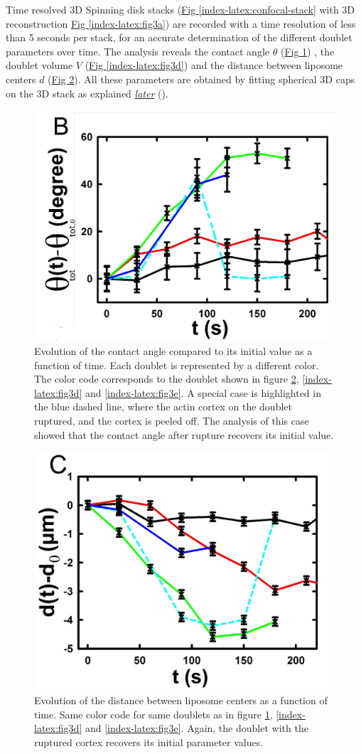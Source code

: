\documentclass[A4paperpaper,11pt,english]{sphinxmanual}
\begin{document}
Time resolved 3D Spinning disk stacks (\hyperref[index-latex:confocal-stack]{Fig  \ref*{index-latex:confocal-stack}} with 3D reconstruction
\hyperref[index-latex:fig3a]{Fig  \ref*{index-latex:fig3a}}) are recorded with a time resolution of less than 5 seconds per stack, for an accurate determination of the different
doublet parameters over time. The analysis reveals the contact angle \(\theta\) (\hyperref[index-latex:fig3b]{Fig  \ref*{index-latex:fig3b}}) , the
doublet volume \(V\) (\hyperref[index-latex:fig3d]{Fig  \ref*{index-latex:fig3d}}) and the distance between liposome
centers \(d\) (\hyperref[index-latex:fig3c]{Fig  \ref*{index-latex:fig3c}}). All these parameters are obtained by
fitting spherical 3D caps on the 3D stack as explained {\hyperref[index-latex:full3dfit]{\emph{later}}} ().
\begin{figure}[htbp]
\centering
\capstart

\includegraphics[width=0.500\linewidth]{Fig_03-B.png}
\caption{Evolution of the contact angle compared to its initial value as a function of
time.  Each doublet is represented by a different color. The color code corresponds to the doublet
shown in figure \hyperref[index-latex:fig3c]{ \ref*{index-latex:fig3c}}, \hyperref[index-latex:fig3d]{ \ref*{index-latex:fig3d}}
and \hyperref[index-latex:fig3e]{ \ref*{index-latex:fig3e}}. A special case is highlighted in the blue dashed line,
where the actin cortex on the doublet ruptured, and the cortex is peeled off.
The analysis of this case showed that the contact angle after rupture recovers its initial value.}\label{index-latex:fig3b}\end{figure}
\begin{figure}[htbp]
\centering
\capstart

\includegraphics[width=0.500\linewidth]{Fig_03-C.png}
\caption{Evolution of the distance between liposome centers as a function of time.
Same color code for same doublets as in figure \hyperref[index-latex:fig3b]{ \ref*{index-latex:fig3b}}, \hyperref[index-latex:fig3d]{ \ref*{index-latex:fig3d}}
and \hyperref[index-latex:fig3e]{ \ref*{index-latex:fig3e}}. Again, the doublet with the ruptured cortex recovers its initial parameter values.}\label{index-latex:fig3c}\end{figure}
\end{document}
